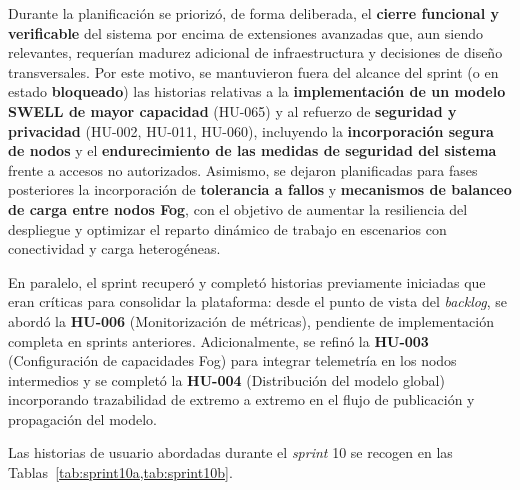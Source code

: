 \documentclass{report}
\begin{document}
Durante la planificación se priorizó, de forma deliberada, el \textbf{cierre funcional y verificable} del sistema por encima de extensiones avanzadas que, aun siendo relevantes, requerían madurez adicional de infraestructura y decisiones de diseño transversales. Por este motivo, se mantuvieron fuera del alcance del sprint (o en estado \textbf{bloqueado}) las historias relativas a la \textbf{implementación de un modelo SWELL de mayor capacidad} (HU-065) y al refuerzo de \textbf{seguridad y privacidad} (HU-002, HU-011, HU-060), incluyendo la \textbf{incorporación segura de nodos} y el \textbf{endurecimiento de las medidas de seguridad del sistema} frente a accesos no autorizados. Asimismo, se dejaron planificadas para fases posteriores la incorporación de \textbf{tolerancia a fallos} y \textbf{mecanismos de balanceo de carga entre nodos Fog}, con el objetivo de aumentar la resiliencia del despliegue y optimizar el reparto dinámico de trabajo en escenarios con conectividad y carga heterogéneas.

En paralelo, el sprint recuperó y completó historias previamente iniciadas que eran críticas para consolidar la plataforma: desde el punto de vista del \textit{backlog}, se abordó la \textbf{HU-006} (Monitorización de métricas), pendiente de implementación completa en sprints anteriores. Adicionalmente, se refinó la \textbf{HU-003} (Configuración de capacidades Fog) para integrar telemetría en los nodos intermedios y se completó la \textbf{HU-004} (Distribución del modelo global) incorporando trazabilidad de extremo a extremo en el flujo de publicación y propagación del modelo.

Las historias de usuario abordadas durante el \textit{sprint} 10 se recogen en las Tablas~\ref{tab:sprint10a,tab:sprint10b}.
\end{document}
